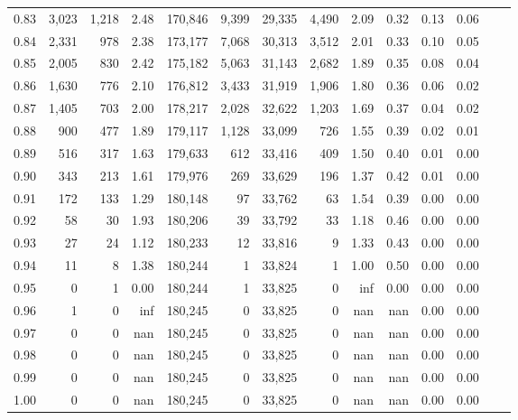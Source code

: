 \begin{tabular}{rrrrrrrrrrrrrr}
0.83 &  3,023 &  1,218 &    2.48 &  170,846 &    9,399 &  29,335 &   4,490 &  2.09 &  0.32 &  0.13 &      0.06 \\
0.84 &  2,331 &    978 &    2.38 &  173,177 &    7,068 &  30,313 &   3,512 &  2.01 &  0.33 &  0.10 &      0.05 \\
0.85 &  2,005 &    830 &    2.42 &  175,182 &    5,063 &  31,143 &   2,682 &  1.89 &  0.35 &  0.08 &      0.04 \\
0.86 &  1,630 &    776 &    2.10 &  176,812 &    3,433 &  31,919 &   1,906 &  1.80 &  0.36 &  0.06 &      0.02 \\
0.87 &  1,405 &    703 &    2.00 &  178,217 &    2,028 &  32,622 &   1,203 &  1.69 &  0.37 &  0.04 &      0.02 \\
0.88 &    900 &    477 &    1.89 &  179,117 &    1,128 &  33,099 &     726 &  1.55 &  0.39 &  0.02 &      0.01 \\
0.89 &    516 &    317 &    1.63 &  179,633 &      612 &  33,416 &     409 &  1.50 &  0.40 &  0.01 &      0.00 \\
0.90 &    343 &    213 &    1.61 &  179,976 &      269 &  33,629 &     196 &  1.37 &  0.42 &  0.01 &      0.00 \\
0.91 &    172 &    133 &    1.29 &  180,148 &       97 &  33,762 &      63 &  1.54 &  0.39 &  0.00 &      0.00 \\
0.92 &     58 &     30 &    1.93 &  180,206 &       39 &  33,792 &      33 &  1.18 &  0.46 &  0.00 &      0.00 \\
0.93 &     27 &     24 &    1.12 &  180,233 &       12 &  33,816 &       9 &  1.33 &  0.43 &  0.00 &      0.00 \\
0.94 &     11 &      8 &    1.38 &  180,244 &        1 &  33,824 &       1 &  1.00 &  0.50 &  0.00 &      0.00 \\
0.95 &      0 &      1 &    0.00 &  180,244 &        1 &  33,825 &       0 &   inf &  0.00 &  0.00 &      0.00 \\
0.96 &      1 &      0 &     inf &  180,245 &        0 &  33,825 &       0 &   nan &   nan &  0.00 &      0.00 \\
0.97 &      0 &      0 &     nan &  180,245 &        0 &  33,825 &       0 &   nan &   nan &  0.00 &      0.00 \\
0.98 &      0 &      0 &     nan &  180,245 &        0 &  33,825 &       0 &   nan &   nan &  0.00 &      0.00 \\
0.99 &      0 &      0 &     nan &  180,245 &        0 &  33,825 &       0 &   nan &   nan &  0.00 &      0.00 \\
1.00 &      0 &      0 &     nan &  180,245 &        0 &  33,825 &       0 &   nan &   nan &  0.00 &      0.00 \\
\bottomrule
\end{tabular}

